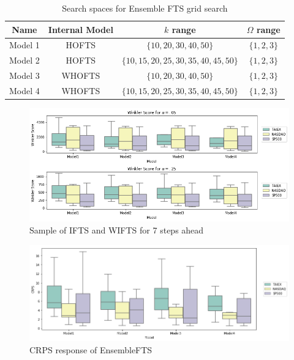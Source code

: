 \begin{table}[htb]
    \centering
    \begin{tabular}{|c|c|c|c|} \hline
        Name & Internal Model & $k$ range & $\Omega$ range  \\ \hline
        Model 1 & HOFTS & $\{10, 20, 30, 40, 50\}$ & $\{1, 2, 3\}$ \\ \hline
        Model 2 & HOFTS & $\{10, 15, 20, 25, 30, 35, 40, 45, 50\}$ & $\{1, 2, 3\}$ \\ \hline
        Model 3 & WHOFTS & $\{10, 20, 30, 40, 50\}$ & $\{1, 2, 3\}$ \\ \hline
        Model 4 & WHOFTS & $\{10, 15, 20, 25, 30, 35, 40, 45, 50\}$ & $\{1, 2, 3\}$ \\ \hline
    \end{tabular}
    \caption{Search spaces for Ensemble FTS grid search}
    \label{tab:ensemblefts_gridsearch}
\end{table}

\begin{figure}[htb]
    \centering
    \includegraphics[width=\textwidth]{figures/ensemblefts_winklerscore.png}
    \caption{Sample of IFTS and WIFTS for 7 steps ahead}
    \label{fig:ensemblefts_winklerscore}
\end{figure}

\begin{figure}[htb]
    \centering
    \includegraphics[width=\textwidth]{figures/ensemblefts_crps.png}
    \caption{CRPS response of EnsembleFTS}
    \label{fig:ensemblefts_crps}
\end{figure}

